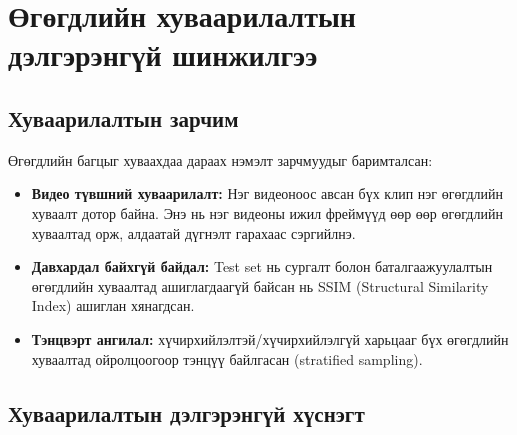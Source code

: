 \section{Өгөгдлийн хуваарилалтын дэлгэрэнгүй шинжилгээ}

\subsection{Хуваарилалтын зарчим}

Өгөгдлийн багцыг хуваахдаа дараах нэмэлт зарчмуудыг баримталсан:

\begin{itemize}
    \item \textbf{Видео түвшний хуваарилалт:} Нэг видеоноос авсан бүх клип нэг өгөгдлийн хуваалт дотор байна. Энэ нь нэг видеоны ижил фреймүүд өөр өөр өгөгдлийн хуваалтад орж, алдаатай дүгнэлт гарахаас сэргийлнэ.
    \item \textbf{Давхардал байхгүй байдал:} Test set нь сургалт болон баталгаажуулалтын өгөгдлийн хуваалтад ашиглагдаагүй байсан нь SSIM (Structural Similarity Index) ашиглан хянагдсан.
    \item \textbf{Тэнцвэрт ангилал:} хүчирхийлэлтэй/хүчирхийлэлгүй харьцааг бүх өгөгдлийн хуваалтад ойролцоогоор тэнцүү байлгасан (stratified sampling).
\end{itemize}

\subsection{Хуваарилалтын дэлгэрэнгүй хүснэгт}

\begin{table}[htbp]
\centering
\caption{Өгөгдлийн багц бүрийн өгөгдлийн хуваалтын дэлгэрэнгүй хуваарилалт}
\label{tab:partition_detail}
\end{table}

